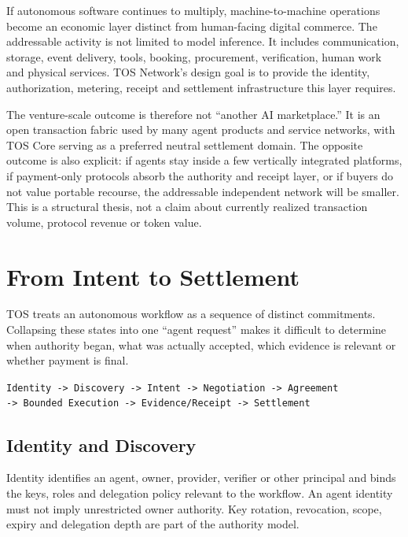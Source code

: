\documentclass[11pt,oneside]{article}
\begin{document}
If autonomous software continues to multiply, machine-to-machine operations become an
economic layer distinct from human-facing digital commerce. The addressable activity is not
limited to model inference. It includes communication, storage, event delivery, tools,
booking, procurement, verification, human work and physical services. TOS Network's design
goal is to provide the identity, authorization, metering, receipt and settlement
infrastructure this layer requires.

The venture-scale outcome is therefore not ``another AI marketplace.'' It is an open
transaction fabric used by many agent products and service networks, with TOS Core serving as
a preferred neutral settlement domain. The opposite outcome is also explicit: if agents stay
inside a few vertically integrated platforms, if payment-only protocols absorb the authority
and receipt layer, or if buyers do not value portable recourse, the addressable independent
network will be smaller. This is a structural thesis, not a claim about currently realized
transaction volume, protocol revenue or token value.

\section{From Intent to Settlement}
\label{sec:operation-model}

TOS treats an autonomous workflow as a sequence of distinct commitments. Collapsing these
states into one ``agent request'' makes it difficult to determine when authority began, what
was actually accepted, which evidence is relevant or whether payment is final.

\begin{center}
\texttt{Identity -> Discovery -> Intent -> Negotiation -> Agreement}\\
\texttt{-> Bounded Execution -> Evidence/Receipt -> Settlement}
\end{center}

\subsection{Identity and Discovery}

Identity identifies an agent, owner, provider, verifier or other principal and binds the keys,
roles and delegation policy relevant to the workflow. An agent identity must not imply
unrestricted owner authority. Key rotation, revocation, scope, expiry and delegation depth are
part of the authority model.
\end{document}
